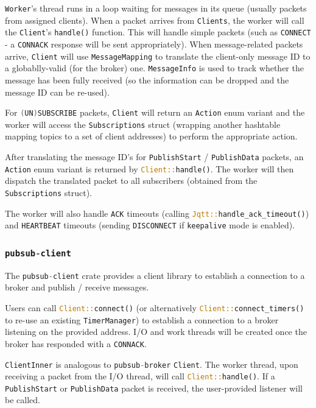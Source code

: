 \documentclass[a4paper]{article}
\numberwithin{figure}{section}
\numberwithin{table}{section}
\newcommand{\mi}{\mintinline}
\begin{document}
\mi{rust}{Worker}'s thread runs in a loop waiting for messages in its queue (usually packets from assigned clients). When a packet arrives from \mi{rust}{Clients}, the worker will call the \mi{rust}{Client}'s \mi{rust}{handle()} function. This will handle simple packets (such as \mi{c}{CONNECT} - a \mi{c}{CONNACK} response will be sent appropriately). When message-related packets arrive, \mi{rust}{Client} will use \mi{rust}{MessageMapping} to translate the client-only message ID to a globablly-valid (for the broker) one. \mi{rust}{MessageInfo} is used to track whether the message has been fully received (so the information can be dropped and the message ID can be re-used).

For \mi{c}{(UN)SUBSCRIBE} packets, \mi{rust}{Client} will return an \mi{rust}{Action} enum variant and the worker will access the \mi{rust}{Subscriptions} struct (wrapping another hashtable mapping topics to a set of client addresses) to perform the appropriate action.

After translating the message ID's for \mi{rust}{PublishStart} / \mi{rust}{PublishData} packets, an \mi{rust}{Action} enum variant is returned by \mi{rust}{Client::handle()}. The worker will then dispatch the translated packet to all subscribers (obtained from the \mi{rust}{Subscriptions} struct).

The worker will also handle \mi{c}{ACK} timeouts (calling \mi{rust}{Jqtt::handle_ack_timeout()}) and \mi{c}{HEARTBEAT} timeouts (sending \mi{c}{DISCONNECT} if \mi{c}{keepalive} mode is enabled).

\subsubsection{\mi{c}{pubsub-client}}
The \mi{c}{pubsub-client} crate provides a client library to establish a connection to a broker and publish / receive messages.

\medskip
\noindent Users can call \mi{rust}{Client::connect()} (or alternatively \mi{rust}{Client::connect_timers()} to re-use an existing \mi{rust}{TimerManager}) to establish a connection to a broker listening on the provided address. I/O and work threads will be created once the broker has responded with a \mi{c}{CONNACK}.

\mi{rust}{ClientInner} is analogous to \mi{c}{pubsub-broker} \mi{rust}{Client}. The worker thread, upon receiving a packet from the I/O thread, will call \mi{rust}{Client::handle()}. If a \mi{c}{PublishStart} or \mi{c}{PublishData} packet is received, the user-provided listener will be called.
\end{document}
